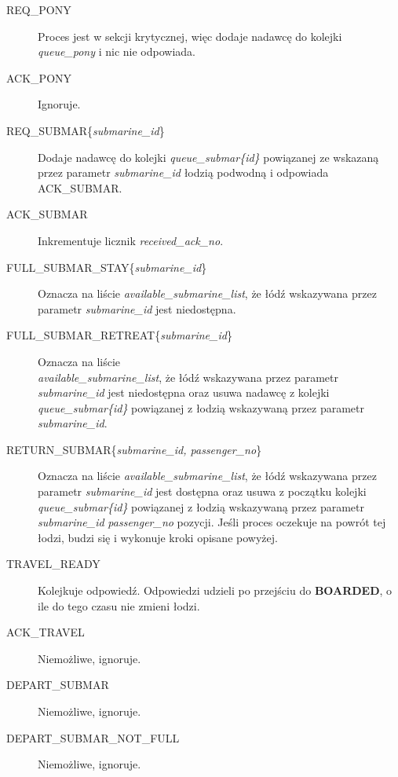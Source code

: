 \documentclass[a4paper]{article}
\begin{document}
\begin{description}
    \item [REQ\_PONY] Proces jest w sekcji krytycznej, więc dodaje nadawcę do kolejki \textit{queue\_pony} i nic nie odpowiada.
    \item [ACK\_PONY] Ignoruje.
    \item [REQ\_SUBMAR\{\textit{submarine\_id}\}] Dodaje nadawcę do kolejki \textit{queue\_submar\{id\}} powiązanej ze wskazaną przez parametr \textit{submarine\_id} łodzią podwodną i odpowiada ACK\_SUBMAR.
    \item [ACK\_SUBMAR] Inkrementuje licznik \textit{received\_ack\_no}.
    \item [FULL\_SUBMAR\_STAY\{\textit{submarine\_id}\}] Oznacza na liście \textit{available\_submarine\_list}, że łódź wskazywana przez parametr \textit{submarine\_id} jest niedostępna.
    \item [FULL\_SUBMAR\_RETREAT\{\textit{submarine\_id}\}] Oznacza na liście\\
     \textit{available\_submarine\_list}, że łódź wskazywana przez parametr \textit{submarine\_id} jest niedostępna oraz usuwa nadawcę z kolejki \textit{queue\_submar\{id\}} powiązanej z łodzią wskazywaną przez parametr \textit{submarine\_id}.
    \item [RETURN\_SUBMAR\{\textit{submarine\_id, passenger\_no}\}] Oznacza na liście \textit{available\_submarine\_list}, że łódź wskazywana przez parametr \textit{submarine\_id} jest dostępna
    oraz usuwa z początku kolejki \textit{queue\_submar\{id\}} powiązanej z łodzią wskazywaną przez parametr \textit{submarine\_id} \textit{passenger\_no} pozycji.
    Jeśli proces oczekuje na powrót tej łodzi, budzi się i wykonuje kroki opisane powyżej.
    \item [TRAVEL\_READY] Kolejkuje odpowiedź. Odpowiedzi udzieli po przejściu do \textbf{BOARDED}, o ile do tego czasu nie zmieni łodzi.
    \item [ACK\_TRAVEL] Niemożliwe, ignoruje.
    \item [DEPART\_SUBMAR] Niemożliwe, ignoruje.
    \item [DEPART\_SUBMAR\_NOT\_FULL] Niemożliwe, ignoruje.
\end{description}

\resetlinenumber[1]\linenumbers
\end{document}
